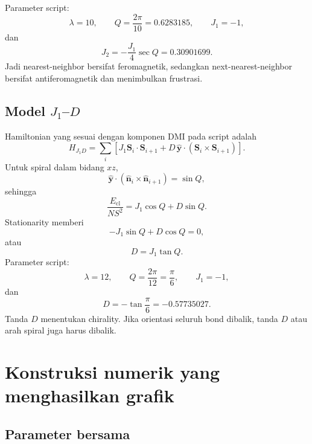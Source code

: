 \documentclass[11pt,a4paper]{article}
\newcommand{\vS}{\bm S}
\newcommand{\vn}{\widehat{\bm n}}
\begin{document}
Parameter script:
\begin{equation}
\lambda=10,
\qquad
Q=\frac{2\pi}{10}=0.6283185,
\qquad
J_1=-1,
\end{equation}
dan
\begin{equation}
\boxed{
J_2=-\frac{J_1}{4}\sec Q
=0.30901699.}
\end{equation}
Jadi nearest-neighbor bersifat feromagnetik, sedangkan next-nearest-neighbor bersifat antiferomagnetik dan menimbulkan frustrasi.

\subsection{Model \texorpdfstring{$J_1$--$D$}{J1--D}}

Hamiltonian yang sesuai dengan komponen DMI pada script adalah
\begin{equation}
H_{J_1D}
=\sum_i
\left[
J_1\vS_i\cdot\vS_{i+1}
+D\,\widehat{\bm y}\cdot
(\vS_i\times\vS_{i+1})
\right].
\label{eq:j1d}
\end{equation}
Untuk spiral dalam bidang $xz$,
\begin{equation}
\widehat{\bm y}\cdot
(\vn_i\times\vn_{i+1})=\sin Q,
\end{equation}
sehingga
\begin{equation}
\frac{E_{\mathrm{cl}}}{NS^2}
=J_1\cos Q+D\sin Q.
\end{equation}
Stationarity memberi
\begin{equation}
-J_1\sin Q+D\cos Q=0,
\end{equation}
atau
\begin{equation}
\boxed{D=J_1\tan Q.}
\label{eq:dmpitch}
\end{equation}
Parameter script:
\begin{equation}
\lambda=12,
\qquad
Q=\frac{2\pi}{12}=\frac\pi6,
\qquad
J_1=-1,
\end{equation}
dan
\begin{equation}
\boxed{D=-\tan\frac\pi6=-0.57735027.}
\end{equation}
Tanda $D$ menentukan chirality. Jika orientasi seluruh bond dibalik, tanda $D$ atau arah spiral juga harus dibalik.

\section{Konstruksi numerik yang menghasilkan grafik}

\subsection{Parameter bersama}
\end{document}

